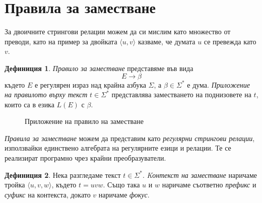 \documentclass[12pt, oneside]{article}
\theoremstyle{definition}
\newtheorem{definition}{Дефиниция}[section]
\begin{document}
\section{Правила за заместване}

За двоичните стрингови релации можем да си мислим като множество от преводи, като на пример за двойката \( \langle u, v \rangle \) казваме, че думата \( u \) се превежда като \( v \).

\begin{definition}
	\emph{Правило за заместване} представяме във вида
	\[ E \to \beta \]
	където \( E \) е регулярен израз над крайна азбука \( \Sigma \), а \( \beta \in \Sigma^* \) е дума.
	\emph{Приложение на правилото върху текст} \( t \in \Sigma^* \) представлява заместването на поднизовете на \( t \), които са в езика \( L(E) \) с \( \beta \).
\end{definition}

\begin{figure}[!htb]
	\centering
	\caption{Приложение на правило на заместване}
\end{figure}

\noindent \emph{Правила за заместване} можем да представим като \emph{регулярни стрингови релации}, използвайки единствено алгебрата на регулярните езици и релации. Те се реализират програмно чрез крайни преобразуватели. \cite{Kaplan&Kay:94}

\begin{definition}
	Нека разгледаме текст \( t \in \Sigma^* \). \emph{Kонтекст на заместване} наричаме тройка \( \langle u,v,w \rangle \), където \( t = uvw \). Също така \( u \) и \( w \) наричаме съответно \emph{префикс} и \emph{суфикс} на контекста, докато \( v \) наричаме \emph{фокус}.
\end{definition}
\end{document}
